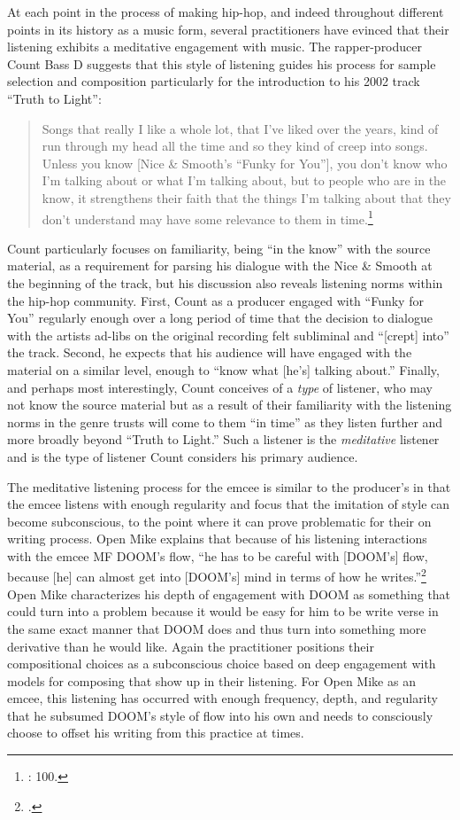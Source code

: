 At each point in the process of making hip-hop, and indeed throughout different points in
its history as a music form, several practitioners have evinced that their listening exhibits
a meditative engagement with music. The rapper-producer Count Bass D suggests that this style
of listening guides his process for sample selection and composition particularly for the
introduction to his 2002 track ``Truth to Light'': 
\begin{quote}
    Songs that really I like a whole lot, that I've liked over the years, kind of run through my head all
    the time and so they kind of creep into songs. \textellipsis Unless you know [Nice \& Smooth's ``Funky
    for You''], you don't know who I'm talking about or what I'm talking about, but to people who are in
    the know, it strengthens their faith that the things I'm talking about that they don't understand may
    have some relevance to them in time.\footnote{\cite{mickeyhessHipHopDead2007}: 100.}
\end{quote}
Count particularly focuses on familiarity, being ``in the know'' with the source material, as
a requirement for parsing his dialogue with the Nice \& Smooth at the beginning of the track, but
his discussion also reveals listening norms within the hip-hop community. First, Count as a producer
engaged with ``Funky for You'' regularly enough over a long period of time that the decision to
dialogue with the artists ad-libs on the original recording felt subliminal and ``[crept] into''
the track. Second, he expects that his audience will have engaged with the material on a similar
level, enough to ``know what [he's] talking about.'' Finally, and perhaps most interestingly,
Count conceives of a \emph{type} of listener, who may not know the source material but as a
result of their familiarity with the listening norms in the genre trusts will come to them
``in time'' as they listen further and more broadly beyond ``Truth to Light.'' Such a
listener is the \emph{meditative} listener and is the type of listener Count considers
his primary audience.

The meditative listening process for the emcee is similar to the producer's in that the emcee
listens with enough regularity and focus that the imitation of style can become subconscious,
to the point where it can prove problematic for their on writing process. Open Mike explains
that because of his listening interactions with the emcee MF DOOM's flow, ``he has to be 
careful with [DOOM's] flow, because [he] can almost get into [DOOM's] mind in terms of how he 
writes.''\footnote{\cite{estellecaswellRappingDeconstructedBest2016}.} Open Mike characterizes
his depth of engagement with DOOM as something that could turn into a problem because it would
be easy for him to be write verse in the same exact manner that DOOM does and thus turn into
something more derivative than he would like. Again the practitioner positions their compositional
choices as a subconscious choice based on deep engagement with models for composing that show 
up in their listening. For Open Mike as an emcee, this listening has occurred with enough
frequency, depth, and regularity that he subsumed DOOM's style of flow into his own and needs
to consciously choose to offset his writing from this practice at times.

